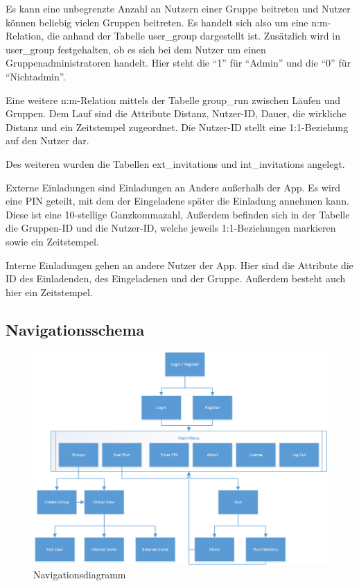 Es kann eine unbegrenzte Anzahl an Nutzern einer Gruppe beitreten und Nutzer können beliebig vielen Gruppen beitreten. Es handelt sich also um eine n:m-Relation, die anhand der Tabelle user\_group dargestellt ist. Zusätzlich wird in user\_group festgehalten, ob es sich bei dem Nutzer um einen Gruppenadministratoren handelt. Hier steht die ``1'' für ``Admin'' und die ``0'' für ``Nichtadmin''.

Eine weitere n:m-Relation mittels der Tabelle group\_run zwischen Läufen und Gruppen. Dem Lauf sind die Attribute Distanz, Nutzer-ID, Dauer, die wirkliche Distanz und ein Zeitstempel zugeordnet. Die Nutzer-ID stellt eine 1:1-Beziehung auf den Nutzer dar.

Des weiteren wurden die Tabellen ext\_invitations und int\_invitations angelegt.

Externe Einladungen sind Einladungen an Andere außerhalb der App. Es wird eine PIN geteilt, mit dem der Eingeladene später die Einladung annehmen kann. Diese ist eine 10-stellige Ganzkommazahl, Außerdem befinden sich in der Tabelle die Gruppen-ID und die Nutzer-ID, welche jeweils 1:1-Beziehungen markieren sowie ein Zeitstempel.

Interne Einladungen gehen an andere Nutzer der App. Hier sind die Attribute die ID des Einladenden, des Eingeladenen und der Gruppe. Außerdem besteht auch hier ein Zeitstempel.
\subsection{Navigationsschema}
\begin{figure}[!h]
\centering
\includegraphics[width=\textwidth]{abb/navigation_diagram}
\caption{Navigationsdiagramm}
\end{figure}

